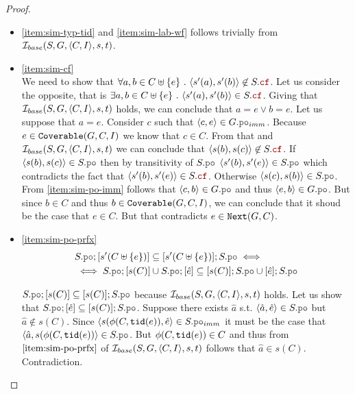 \documentclass[12pt]{article}
\begin{document}
\begin{proof}
\begin{itemize}
  \item \ref{item:sim-typ-tid} and \ref{item:sim-lab-wf}
    follows trivially from $\mathcal{I}_{base}(S, G, \langle C, I \rangle, s, t)$.
    
  \item \ref{item:sim-cf} \\
    We need to show that
    $\forall{a, b \in \lC \uplus \{e\}} ~.~ \tup{s'(a), s'(b)} \not\in S.\lCF$.
    Let us consider the opposite, that is
    $\exists{a, b \in \lC \uplus \{e\}} ~.~ \tup{s'(a), s'(b)} \in S.\lCF$.
    Giving that $\mathcal{I}_{base}(S, G, \langle C, I \rangle, s, t)$ holds,
    we can conclude that \mbox{$a = e \vee b = e$}.
    Let us suppose that $a = e$.
    Consider $c$ such that $\tup{c, e} \in G.\lPO_{imm}$.
    Because $e \in {\mathtt{Coverable}}(G, C, I)$ we know that $c \in C$.
    From that and $\mathcal{I}_{base}(S, G, \langle C, I \rangle, s, t)$
    we can conclude that $\tup{s(b), s(c)} \not\in S.\lCF$.
    If $\tup{s(b), s(c)} \in S.\lPO$ then by transitivity of $S.\lPO$
    $\tup{s'(b), s'(e)} \in S.\lPO$
    which contradicts the fact that $\tup{s'(b), s'(e)} \in S.\lCF$.
    Otherwise \mbox{$\tup{s(c), s(b)} \in S.\lPO$}.
    From \ref{item:sim-po-imm} follows that $\tup{c, b} \in G.\lPO$
    and thus $\tup{e, b} \in G.\lPO$.
    But since $b \in C$ and thus $b \in {\mathtt{Coverable}}(G, C, I)$,
    we can conclude that it shoud be the case that $e \in C$.
    But that contradicts $e \in {\mathtt{Next}}(G, C)$.

  \item \ref{item:sim-po-prfx} \\

    \begin{equation*}
      \begin{split}
        &     S.\lPO;[s'(C \uplus \{e\})] \subseteq [s'(C \uplus \{e\})];S.\lPO \iff \\
        &\iff S.\lPO;[s(C)] \cup S.\lPO;[\hat{e}] \subseteq [s(C)];S.\lPO \cup [\hat{e}];S.\lPO
      \end{split}
    \end{equation*}

    $S.\lPO;[s(C)] \subseteq [s(C)];S.\lPO$ because $\mathcal{I}_{base}(S, G, \langle C, I \rangle, s, t)$ holds.
    Let us show that $S.\lPO;[\hat{e}] \subseteq [s(C)];S.\lPO$.
    Suppose there exists $\hat{a}$ s.t. $\tup{\hat{a}, \hat{e}} \in S.\lPO$ but
    $\hat{a} \not\in s(C)$.
    Since $\tup{s(\front(C, \lTID(e)), \hat{e}} \in S.\lPO_{imm}$
    it must be the case that $\tup{\hat{a}, s(\front(C, \lTID(e))} \in S.\lPO$.
    But $\phi(C, {\mathtt{tid}}(e)) \in C$ and thus from $\ref{item:sim-po-prfx}$
    of $\mathcal{I}_{base}(S, G, \langle C, I \rangle, s, t)$ follows that $\hat{a} \in s(C)$. Contradiction.


\end{itemize}
\end{proof}
\end{document}
